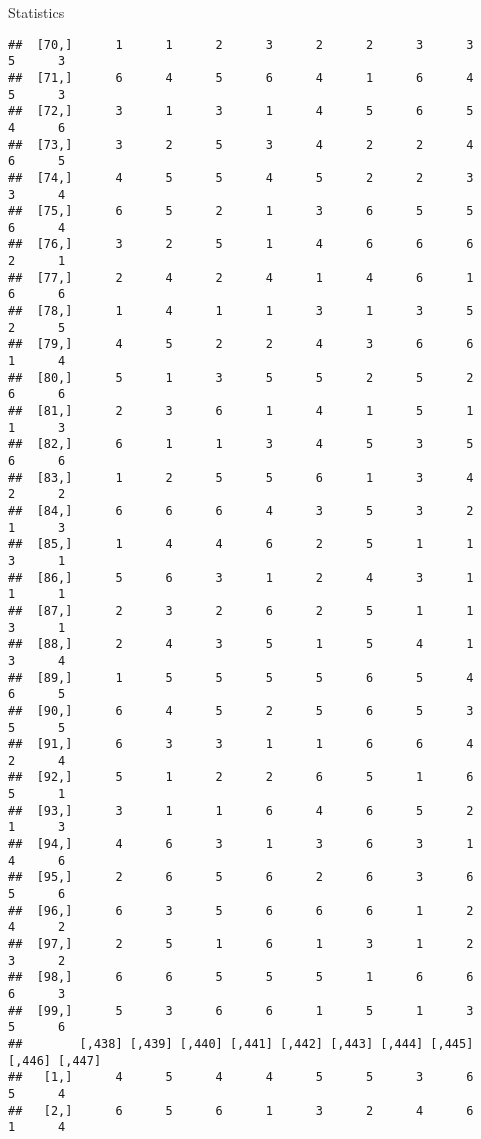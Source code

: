 \documentclass[
  ignorenonframetext,
]{beamer}
\begin{document}
\begin{frame}[fragile]{Statistics}
\begin{verbatim}
##  [70,]      1      1      2      3      2      2      3      3      5      3
##  [71,]      6      4      5      6      4      1      6      4      5      3
##  [72,]      3      1      3      1      4      5      6      5      4      6
##  [73,]      3      2      5      3      4      2      2      4      6      5
##  [74,]      4      5      5      4      5      2      2      3      3      4
##  [75,]      6      5      2      1      3      6      5      5      6      4
##  [76,]      3      2      5      1      4      6      6      6      2      1
##  [77,]      2      4      2      4      1      4      6      1      6      6
##  [78,]      1      4      1      1      3      1      3      5      2      5
##  [79,]      4      5      2      2      4      3      6      6      1      4
##  [80,]      5      1      3      5      5      2      5      2      6      6
##  [81,]      2      3      6      1      4      1      5      1      1      3
##  [82,]      6      1      1      3      4      5      3      5      6      6
##  [83,]      1      2      5      5      6      1      3      4      2      2
##  [84,]      6      6      6      4      3      5      3      2      1      3
##  [85,]      1      4      4      6      2      5      1      1      3      1
##  [86,]      5      6      3      1      2      4      3      1      1      1
##  [87,]      2      3      2      6      2      5      1      1      3      1
##  [88,]      2      4      3      5      1      5      4      1      3      4
##  [89,]      1      5      5      5      5      6      5      4      6      5
##  [90,]      6      4      5      2      5      6      5      3      5      5
##  [91,]      6      3      3      1      1      6      6      4      2      4
##  [92,]      5      1      2      2      6      5      1      6      5      1
##  [93,]      3      1      1      6      4      6      5      2      1      3
##  [94,]      4      6      3      1      3      6      3      1      4      6
##  [95,]      2      6      5      6      2      6      3      6      5      6
##  [96,]      6      3      5      6      6      6      1      2      4      2
##  [97,]      2      5      1      6      1      3      1      2      3      2
##  [98,]      6      6      5      5      5      1      6      6      6      3
##  [99,]      5      3      6      6      1      5      1      3      5      6
##        [,438] [,439] [,440] [,441] [,442] [,443] [,444] [,445] [,446] [,447]
##   [1,]      4      5      4      4      5      5      3      6      5      4
##   [2,]      6      5      6      1      3      2      4      6      1      4

\end{verbatim}
\end{frame}
\end{document}
